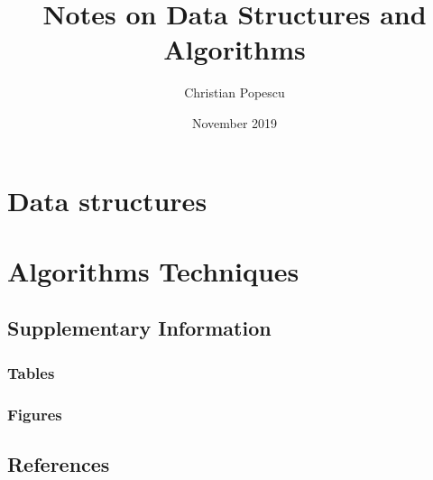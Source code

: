 \documentclass[a4paper,12pt]{book}
\begin{document}
\author{Christian Popescu}
\title{Notes on Data Structures and Algorithms}
\date{November 2019}

\frontmatter
\maketitle
\tableofcontents
\setcounter{secnumdepth}{5}

\mainmatter
\part{Data structures}





\part{Algorithms Techniques}

\backmatter
\begin{appendices}
	
	\chapter{Supplementary Information}
	
	\section{Tables}
	
	\section{Figures}
	
	\chapter{References}
	
\printbibliography
	
%	
	
\end{appendices}
\end{document}
